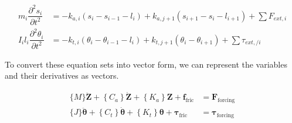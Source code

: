 \begin{align}\label{Governing equations}
     m_{i}\dfrac{\partial^{2}s_{i}}{\partial t^{2}} & = -k_{a,i}(s_{i}-s_{i-1}-l_{i}) + k_{a,j+1}(s_{i+1}-s_{i}-l_{i+1}) + \sum{F_{ext, i}} \\
     I_{i}l_{i}\dfrac{\partial^{2}\theta_{i}}{\partial t^{2}} & = -k_{t,i}(\theta_{i}-\theta_{i-1}-l_{i}) + k_{t,j+1}(\theta_{i}-\theta_{i+1}) + \sum{\tau_{ext,/ i}}
\end{align}

To convert these equation sets into vector form, we can represent the variables and their derivatives as vectors.

\begin{align}
  \{M\} \ddot{\boldsymbol{Z}}+\left\{C_a\right\} \dot{\boldsymbol{Z}}+\left\{K_a\right\} \boldsymbol{Z}+\boldsymbol{f}_{\text{fric}} &= \boldsymbol{F}_{\text{forcing}} \label{eq:em_axial_vector_form}\\
  \{J\} \ddot{\boldsymbol{\theta}}+\left\{C_t\right\} \dot{\boldsymbol{\theta}}+\left\{K_t\right\} \boldsymbol{\theta}+\boldsymbol{\tau}_{\text{fric}} &= \boldsymbol{\tau}_{\text{forcing}} \label{eq:em_torsional_vector_form}
\end{align}


